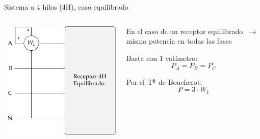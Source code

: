 \documentclass[aspectratio=169, usenames,svgnames,dvipsnames]{beamer}
\begin{document}

\begin{frame}{Sistema a 4 hilos (4H), \hspace{3mm} caso equilibrado}
    \begin{columns}
    \begin{column}{0.45\columnwidth}
    
        \vspace{6mm}

        \hspace*{5mm}
        \includegraphics[height=0.75\textheight]{../figs/Potencia4H_Equilibrado.pdf}
    \end{column}
    \hfill
    \begin{column}{0.45\columnwidth}
        En el caso de un receptor \alert{equilibrado} $\; \rightarrow \;$ \alert{misma potencia} en todas las fases

        \vspace{4mm}
        Basta con \alert{1 vatímetro}:
        \[
            P_A = P_B = P_C
        \]

        \vspace{2mm}
        Por el $\mbox{T}^{\textrm{\underline{a}}}$ de \alert{Boucherot}:        
        \[
            \boxed{\; P = 3 \cdot W_1 \;}
        \]
    \end{column}
    \end{columns}
\end{frame}

\end{document}
